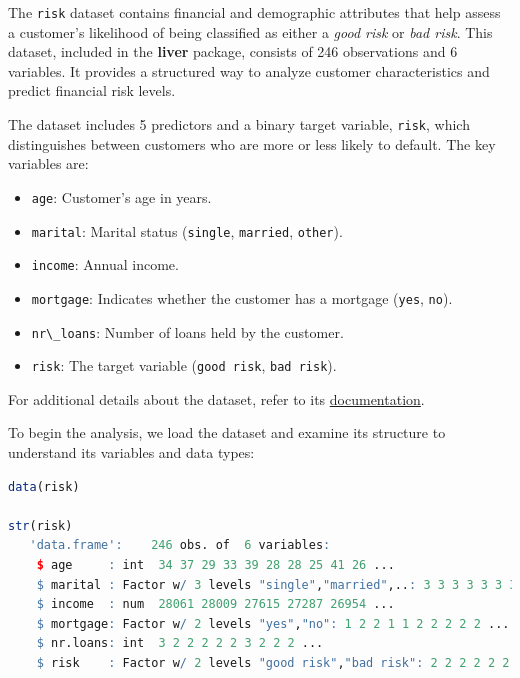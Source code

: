 \documentclass[
  11pt,
]{book}
\newcommand{\passthrough}[1]{#1}
\providecommand{\tightlist}{%
  \setlength{\itemsep}{0pt}\setlength{\parskip}{0pt}}
\theoremstyle{definition}
\theoremstyle{definition}
\theoremstyle{definition}
\theoremstyle{definition}
\theoremstyle{remark}
\begin{document}
The \passthrough{\lstinline!risk!} dataset contains financial and demographic attributes that help assess a customer's likelihood of being classified as either a \emph{good risk} or \emph{bad risk}. This dataset, included in the \textbf{liver} package, consists of 246 observations and 6 variables. It provides a structured way to analyze customer characteristics and predict financial risk levels.

The dataset includes 5 predictors and a binary target variable, \passthrough{\lstinline!risk!}, which distinguishes between customers who are more or less likely to default. The key variables are:

\begin{itemize}
\tightlist
\item
  \passthrough{\lstinline!age!}: Customer's age in years.\\
\item
  \passthrough{\lstinline!marital!}: Marital status (\passthrough{\lstinline!single!}, \passthrough{\lstinline!married!}, \passthrough{\lstinline!other!}).\\
\item
  \passthrough{\lstinline!income!}: Annual income.\\
\item
  \passthrough{\lstinline!mortgage!}: Indicates whether the customer has a mortgage (\passthrough{\lstinline!yes!}, \passthrough{\lstinline!no!}).\\
\item
  \passthrough{\lstinline!nr\_loans!}: Number of loans held by the customer.\\
\item
  \passthrough{\lstinline!risk!}: The target variable (\passthrough{\lstinline!good risk!}, \passthrough{\lstinline!bad risk!}).
\end{itemize}

For additional details about the dataset, refer to its \href{https://search.r-project.org/CRAN/refmans/liver/html/risk.html}{documentation}.

To begin the analysis, we load the dataset and examine its structure to understand its variables and data types:

\begin{lstlisting}[language=R]
data(risk)

str(risk)
   'data.frame':    246 obs. of  6 variables:
    $ age     : int  34 37 29 33 39 28 28 25 41 26 ...
    $ marital : Factor w/ 3 levels "single","married",..: 3 3 3 3 3 3 3 3 3 3 ...
    $ income  : num  28061 28009 27615 27287 26954 ...
    $ mortgage: Factor w/ 2 levels "yes","no": 1 2 2 1 1 2 2 2 2 2 ...
    $ nr.loans: int  3 2 2 2 2 2 3 2 2 2 ...
    $ risk    : Factor w/ 2 levels "good risk","bad risk": 2 2 2 2 2 2 2 2 2 2 ...
\end{lstlisting}
\end{document}
